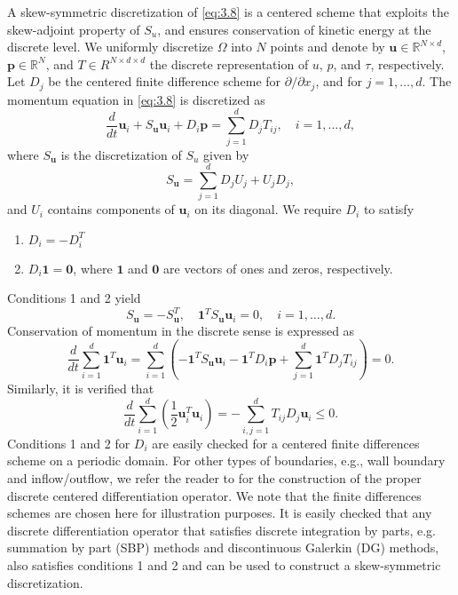 A skew-symmetric discretization of \eqref{eq:3.8} is a centered scheme that exploits the skew-adjoint property of $S_u$, and ensures conservation of kinetic energy at the discrete level. We uniformly discretize $\Omega$ into $N$ points and denote by $\mathbf u \in \mathbb R^{N\times d}$, $\mathbf p \in \mathbb R^N$, and $T \in R^{N\times d\times d} $ the discrete representation of $u$, $p$, and $\tau$, respectively. Let $D_j$ be the centered finite difference scheme for $\partial / \partial x_j$, and for $j = 1,\dots,d$. The momentum equation in \eqref{eq:3.8} is discretized as
\begin{equation} \label{eq:3.13}
	\frac{d}{dt}{\mathbf u}_i + S_{\mathbf u} \mathbf u_i + D_i \mathbf p = \sum_{j=1}^d D_j T_{ij}, \quad i=1,\dots,d,
\end{equation}
where $S_{\mathbf u}$ is the discretization of $S_{u}$ given by
\begin{equation} \label{eq:3.14}
	S_{\mathbf u} = \sum_{j=1}^d D_j U_j + U_j D_j,
\end{equation}
and $U_i$ contains components of $\mathbf u_i$ on its diagonal. We require $D_i$ to satisfy
\begin{enumerate}
	\item $D_i = -D_i^T$
	\item $D_i \mathbf 1 = \mathbf 0$, where $\mathbf 1$ and $\mathbf 0$ are vectors of ones and zeros, respectively.
\end{enumerate}
Conditions 1 and 2 yield
\begin{equation} \label{eq:3.15}
	S_{\mathbf u} = -S_{\mathbf u}^T, \quad \mathbf 1^T S_{\mathbf u} \mathbf u_i = 0, \quad i=1,\dots,d.
\end{equation}
Conservation of momentum in the discrete sense is expressed as
\begin{equation} \label{eq:3.16}
	\frac{d}{dt} \sum_{i=1}^d  \mathbf 1^T \mathbf u_i = \sum_{i=1}^d \left( - \mathbf 1^T S_{\mathbf u} \mathbf u_i - \mathbf 1^T D_i \mathbf p + \sum_{j=1}^d \mathbf 1^T D_j T_{ij}  \right) = 0.
\end{equation}
Similarly, it is verified that
\begin{equation} \label{eq:3.17}
\frac{d}{dt} \sum_{i=1}^d \left( \frac 1 2 \mathbf u_i^T \mathbf u_i \right) = - \sum_{i,j=1}^d T_{ij}D_j \mathbf u_i \leq 0.
\end{equation}
Conditions 1 and 2 for $D_i$ are easily checked for a centered finite differences scheme on a periodic domain. For other types of boundaries, e.g., wall boundary and inflow/outflow, we refer the reader to \cite{morinishi1998fully,desjardins2008high} for the construction of the proper discrete centered differentiation operator. We note that the finite differences schemes are chosen here for illustration purposes. It is easily checked that any discrete differentiation operator that satisfies discrete integration by parts, e.g. summation by part (SBP) methods and discontinuous Galerkin (DG) methods, also satisfies conditions 1 and 2 and can be used to construct a skew-symmetric discretization.

